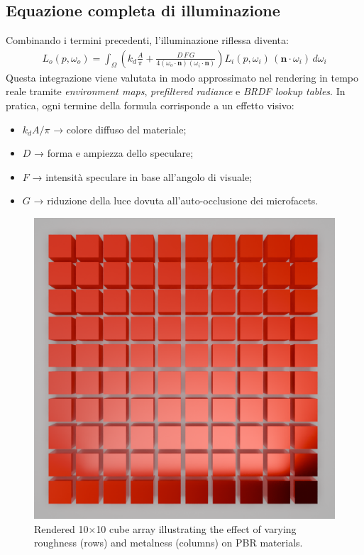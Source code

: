 \documentclass[12pt,a4paper,openright,twoside]{book}
\begin{document}
\subsection*{Equazione completa di illuminazione}
Combinando i termini precedenti, l'illuminazione riflessa diventa:
\begin{align*}
L_o(p,\omega_o) =
\int_{\Omega}
\left(
k_d\frac{A}{\pi} +
\frac{D\,F\,G}
{4(\omega_o\cdot\mathbf{n})(\omega_i\cdot\mathbf{n})}
\right)
L_i(p,\omega_i)\,
(\mathbf{n}\cdot\omega_i)\,d\omega_i
\end{align*}
\noindent
Questa integrazione viene valutata in modo approssimato nel rendering in tempo reale tramite
\emph{environment maps}, \emph{prefiltered radiance} e \emph{BRDF lookup tables}.
In pratica, ogni termine della formula corrisponde a un effetto visivo:
\begin{itemize}
    \item $k_d A/\pi$ → colore diffuso del materiale;
    \item $D$ → forma e ampiezza dello speculare;
    \item $F$ → intensità speculare in base all'angolo di visuale;
    \item $G$ → riduzione della luce dovuta all'auto-occlusione dei microfacets.
\end{itemize}

\begin{figure}[htb!]
   \centering
   \includegraphics[width=.8\linewidth]{figures/pbr_material_render.png}
   \caption{Rendered 10$\times$10 cube array illustrating the effect of varying roughness (rows) and metalness
      (columns) on PBR materials.}
   \label{fig:pbr-material-render}
\end{figure}
\end{document}
